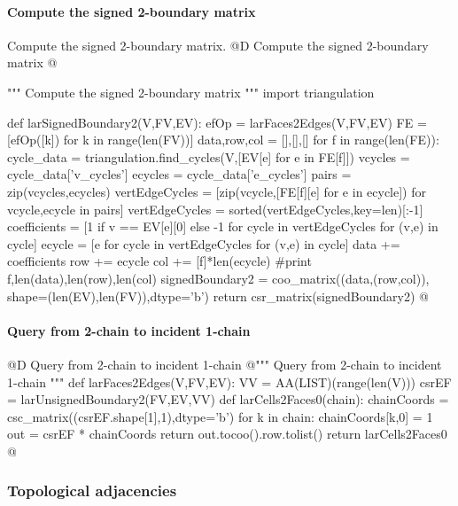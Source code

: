 \documentclass[11pt,oneside]{article}    %
\begin{document}
\paragraph{Compute the signed 2-boundary matrix}
Compute the signed 2-boundary matrix.
@D Compute the signed 2-boundary matrix
@{""" Compute the signed 2-boundary matrix """
import triangulation
    
def larSignedBoundary2(V,FV,EV):
    efOp = larFaces2Edges(V,FV,EV)
    FE = [efOp([k]) for k in range(len(FV))]
    data,row,col = [],[],[]
    for f in range(len(FE)):
        cycle_data = triangulation.find_cycles(V,[EV[e] for e in FE[f]])
        vcycles = cycle_data['v_cycles']
        ecycles = cycle_data['e_cycles']
        pairs = zip(vcycles,ecycles)
        vertEdgeCycles = [zip(vcycle,[FE[f][e] for e in ecycle]) for vcycle,ecycle in pairs]
        vertEdgeCycles = sorted(vertEdgeCycles,key=len)[:-1]
        coefficients = [1 if v == EV[e][0] else -1 for cycle in vertEdgeCycles for (v,e) in cycle]
        ecycle = [e for cycle in vertEdgeCycles for (v,e) in cycle]
        data += coefficients
        row += ecycle
        col += [f]*len(ecycle)
        #print f,len(data),len(row),len(col)
    signedBoundary2 = coo_matrix((data,(row,col)), shape=(len(EV),len(FV)),dtype='b')
    return csr_matrix(signedBoundary2)
@}


\paragraph{Query from 2-chain to incident 1-chain}
@D Query from 2-chain to incident 1-chain
@{""" Query from 2-chain to incident 1-chain """
def larFaces2Edges(V,FV,EV):
    VV = AA(LIST)(range(len(V)))
    csrEF = larUnsignedBoundary2(FV,EV,VV)
    def larCells2Faces0(chain):
        chainCoords = csc_matrix((csrEF.shape[1],1),dtype='b')
        for k in chain: chainCoords[k,0] = 1
        out = csrEF * chainCoords
        return out.tocoo().row.tolist()
    return larCells2Faces0
@}



\subsubsection{Topological adjacencies}
\end{document}
